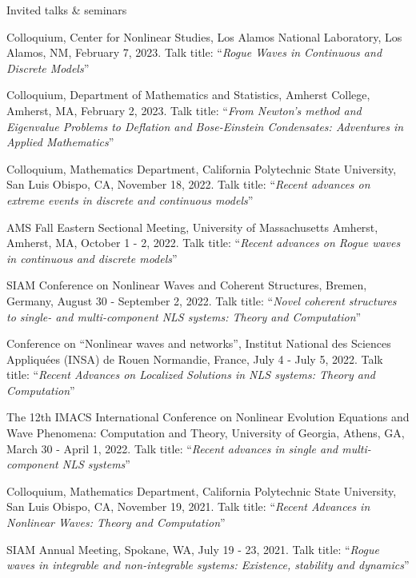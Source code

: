 \documentclass[10pt]{article} %
\begin{document}
\begin{section}{Invited talks \& seminars}
\begin{etaremune}
\item Colloquium, Center for Nonlinear Studies, Los Alamos National Laboratory, Los Alamos, NM, February 7, 2023. 
      Talk title: ``\textit{Rogue Waves in Continuous and Discrete Models}''

\item Colloquium, Department of Mathematics and Statistics, Amherst College, Amherst, MA, February 2, 2023. 
Talk title: ``\textit{From Newton's method and Eigenvalue Problems to Deflation and Bose-Einstein 
Condensates: Adventures in Applied Mathematics}''

\item Colloquium, Mathematics Department, California Polytechnic State University, San Luis Obispo, CA, November 18, 2022. 
Talk title: ``\textit{Recent advances on extreme events in discrete and continuous models}''

\item AMS Fall Eastern Sectional Meeting, University of Massachusetts Amherst, Amherst, MA, October 1 - 2, 2022.
Talk title: ``\textit{Recent advances on Rogue waves in continuous and discrete models}''

\item SIAM Conference on Nonlinear Waves and Coherent Structures, Bremen, Germany, August 30 - September 2, 2022.
Talk title: ``\textit{Novel coherent structures to single- and multi-component NLS systems: Theory and Computation}''

\item Conference on ``Nonlinear waves and networks'', Institut National des Sciences Appliqu\'ees %
(INSA) de Rouen Normandie, France, July 4 - July 5, 2022. %
Talk title: ``\textit{Recent Advances on Localized Solutions in NLS systems: Theory and Computation}''

\item The 12th IMACS International Conference on Nonlinear Evolution Equations and Wave Phenomena: Computation and Theory, %
        University of Georgia, Athens, GA, March 30 - April 1, 2022. 
        Talk title: ``\textit{Recent advances in single and multi-component NLS systems}''

\item Colloquium, Mathematics Department, California Polytechnic State University, San Luis Obispo, CA, November 19, 2021. 
Talk title: ``\textit{Recent Advances in Nonlinear Waves: Theory and Computation}'' 
        
\item SIAM Annual Meeting, Spokane, WA, July 19 - 23, 2021. Talk title: 
``\textit{Rogue waves in integrable and non-integrable systems: Existence, stability and dynamics}''


\end{etaremune}
\end{section}
\end{document}

